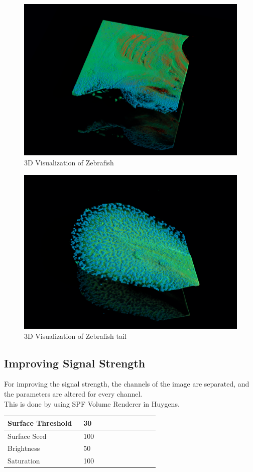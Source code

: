 \documentclass{article}
\begin{document}
\begin{figure}[h!]
    \centering
    \includegraphics[width=0.75\linewidth]{Report/Images/6.4-9/image_2.png}
    \caption{3D Visualization of Zebrafish}
    \label{fig:zebrafish_2}
\end{figure}
\begin{figure}[h!]
    \centering
    \includegraphics[width=0.75\linewidth]{Report/Images/6.4-9/image_3.png}
    \caption{3D Visualization of Zebrafish tail}
    \label{fig:zebrafish_tail}
\end{figure}
\clearpage
\subsection*{Improving Signal Strength}
For improving the signal strength, the channels of the image are separated, and the parameters are altered for every channel. \\
This is done by using SPF Volume Renderer in Huygens. 
\begin{table}[h!]
    \centering
    \begin{tabular}{|p{0.3\linewidth} | p{0.3\linewidth}|}
    \hline
       Surface Threshold & 30 \\   \hline
       Surface Seed & 100 \\  \hline
       Brightness & 50 \\  \hline
       Saturation & 100 \\ \hline
    \end{tabular}
    \label{tab:signal}
\end{table}
\end{document}
